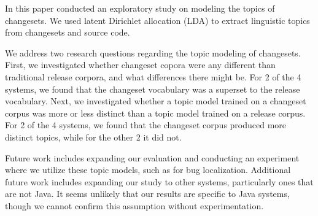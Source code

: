 
In this paper conducted an exploratory study on modeling the topics of
changesets.
We used latent Dirichlet allocation (LDA) to extract linguistic
topics from changesets and source code.

We address two research questions regarding the topic modeling of changesets.
First, we investigated whether changeset copora were any different than
traditional release corpora, and what differences there might be.
For 2 of the 4 systems, we found that the changeset vocabulary was a superset
to the release vocabulary.
Next, we investigated whether a topic model trained on a changeset corpus
was more or less distinct than a topic model trained on a release corpus.
For 2 of the 4 systems, we found that the changeset corpus produced more
distinct topics, while for the other 2 it did not.

Future work includes expanding our evaluation and conducting an experiment
where we utilize these topic models, such as for bug localization.
Additional future work includes expanding our study to other systems, particularly ones that are not Java.
It seems unlikely that our results are specific to Java systems, though we cannot confirm this assumption without experimentation.
 
